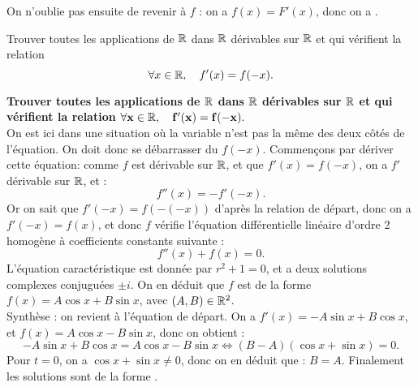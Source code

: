 \documentclass[a4paper, 11pt,reqno]{article}
\begin{document}
\begin{correction}
On n'oublie pas ensuite de revenir \`a $f$ : on a $f(x) = F'(x)$, donc on a .
\end{correction}
\begin{exercice}  \;
Trouver toutes les applications de $\mathbb{R}$ dans $\mathbb{R}$ d\'erivables sur $\mathbb{R}$ et qui v\'erifient la relation
$$\forall x\in\mathbb{R},\quad f^{\prime}(x)=f(-x).$$
\end{exercice}
\begin{correction}  \;
\textbf{Trouver toutes les applications de $\mathbb{R}$ dans $\mathbb{R}$ d\'erivables sur $\mathbb{R}$ et qui v\'erifient la relation $\mathbf{\forall x\in\mathbb{R},\quad f^{\prime}(x)=f(-x).}$}\\
On est ici dans une situation o\`u la variable n'est pas la m\^eme des deux c\^ot\'es de l'\'equation. On doit donc se d\'ebarrasser du $f(-x)$. Commen\c cons par d\'eriver cette \'equation: comme $f$ est d\'erivable sur $\mathbb{R}$, et que $f'(x) = f(-x)$, on a $f'$ d\'erivable sur $\mathbb{R}$, et :
$$f''(x) = - f'(-x).$$
Or on sait que $f'(-x) = f(-(-x))$ d'apr\`es la relation de d\'epart, donc on a $f'(-x) = f(x)$, et donc $f$ v\'erifie l'\'equation diff\'erentielle lin\'eaire d'ordre 2 homog\`ene \`a coefficients constants suivante :
$$f''(x) + f(x) = 0.$$ 
L'\'equation caract\'eristique est donn\'ee par $r^2+1=0$, et a deux solutions complexes conjugu\'ees $\pm i$. On en d\'eduit que $f$ est de la forme $f(x) = A \cos x + B \sin x$, avec $(A,B) \in \mathbb{R}^2$.\\
Synth\`ese : on revient \`a l'\'equation de d\'epart. On a $f'(x) = -A \sin x + B \cos x$, et $f(x) = A \cos x - B \sin x$, donc on obtient :
$$-A \sin x + B \cos x = A \cos x - B \sin x \Leftrightarrow (B-A)(\cos x + \sin x) =0.$$
Pour $t=0$, on a $\cos x + \sin x \not=0$, donc on en d\'eduit que : $B=A$. Finalement les solutions sont de la forme .
\end{correction}
%
\end{document}
